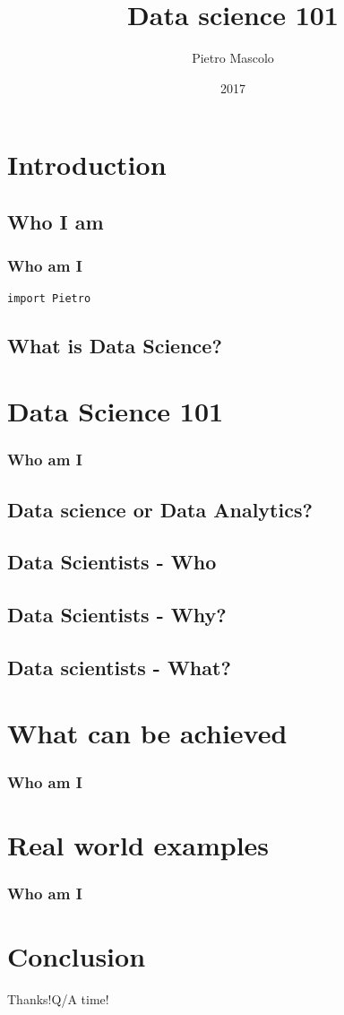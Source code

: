 \documentclass[11pt]{beamer}
\title[Data Science]{\textbf{Data science 101}}
\institute[Optum]{Optum Ireland - UnitedHealth Group}
\author[]{Pietro Mascolo}
\date{2017}
\begin{document}
\maketitle

\section{Introduction}
\subsection{Who I am}

\begin{frame}
	\frametitle{Who am I}
	\texttt{import Pietro}
	\uncover<2->{
	}
\end{frame}

\subsection{What is Data Science?}


\section{Data Science 101}
\begin{frame}
	\frametitle{Who am I}
\end{frame}

\subsection{Data science or Data Analytics?}
\subsection{Data Scientists - Who}
\subsection{Data Scientists - Why?}
\subsection{Data scientists - What?}

\section{What can be achieved}
\begin{frame}
	\frametitle{Who am I}
\end{frame}

\section{Real world examples}
\begin{frame}
	\frametitle{Who am I}
\end{frame}

\section{Conclusion}
\begin{frame}
	\begin{block}
		{Thanks!}{Q/A time!}
	\end{block}
\end{frame}
\end{document}
